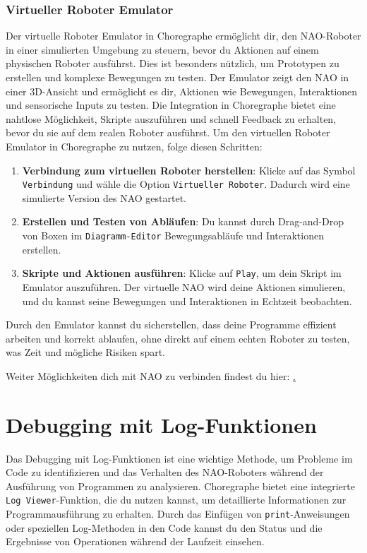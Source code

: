 \subsubsection{Virtueller Roboter Emulator}
Der virtuelle Roboter Emulator in Choregraphe ermöglicht dir, den NAO-Roboter in einer simulierten Umgebung zu steuern, bevor du Aktionen auf einem physischen Roboter ausführst. Dies ist besonders nützlich, um Prototypen zu erstellen und komplexe Bewegungen zu testen. Der Emulator zeigt den NAO in einer 3D-Ansicht und ermöglicht es dir, Aktionen wie Bewegungen, Interaktionen und sensorische Inputs zu testen. Die Integration in Choregraphe bietet eine nahtlose Möglichkeit, Skripte auszuführen und schnell Feedback zu erhalten, bevor du sie auf dem realen Roboter ausführst.
Um den virtuellen Roboter Emulator in Choregraphe zu nutzen, folge diesen Schritten:
\begin{enumerate}
    \item \textbf{Verbindung zum virtuellen Roboter herstellen}: Klicke auf das Symbol \texttt{Verbindung} und wähle die Option \texttt{Virtueller Roboter}. Dadurch wird eine simulierte Version des NAO gestartet.
    \item \textbf{Erstellen und Testen von Abläufen}: Du kannst durch Drag-and-Drop von Boxen im \texttt{Diagramm-Editor} Bewegungsabläufe und Interaktionen erstellen.
    \item \textbf{Skripte und Aktionen ausführen}: Klicke auf \texttt{Play}, um dein Skript im Emulator auszuführen. Der virtuelle NAO wird deine Aktionen simulieren, und du kannst seine Bewegungen und Interaktionen in Echtzeit beobachten.
\end{enumerate}
Durch den Emulator kannst du sicherstellen, dass deine Programme effizient arbeiten und korrekt ablaufen, ohne direkt auf einem echten Roboter zu testen, was Zeit und mögliche Risiken spart.

Weiter Möglichkeiten dich mit NAO zu verbinden findest du hier: \href{http://doc.aldebaran.com/2-8/family/nao_user_guide/nao-connecting.html}. 

\section{Debugging mit Log-Funktionen}
Das Debugging mit Log-Funktionen ist eine wichtige Methode, um Probleme im Code zu identifizieren und das Verhalten des NAO-Roboters während der Ausführung von Programmen zu analysieren. Choregraphe bietet eine integrierte \texttt{Log Viewer}-Funktion, die du nutzen kannst, um detaillierte Informationen zur Programmausführung zu erhalten. Durch das Einfügen von \texttt{print}-Anweisungen oder speziellen Log-Methoden in den Code kannst du den Status und die Ergebnisse von Operationen während der Laufzeit einsehen.

